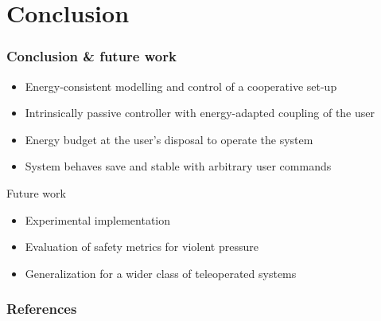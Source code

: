 \documentclass[student]{ITRslides}
\begin{document}
\section{Conclusion}


\begin{frame}
	\frametitle{Conclusion \& future work}
	\begin{itemize}
		\item Energy-consistent modelling and control of a cooperative set-up
		\item Intrinsically passive controller with energy-adapted coupling of the user
		\item Energy budget at the user's disposal to operate the system
		\item System behaves save and stable with arbitrary user commands

  
	\end{itemize}
		\begin{block}{Future work}
\begin{itemize}
\item Experimental implementation
\item Evaluation of safety metrics for violent pressure
\item Generalization for a wider class of teleoperated systems
\end{itemize}
	\end{block}	
\end{frame}
\appendix
\begin{frame}[allowframebreaks]
	\frametitle{References}
	\printbibliography
\end{frame}
\end{document}
